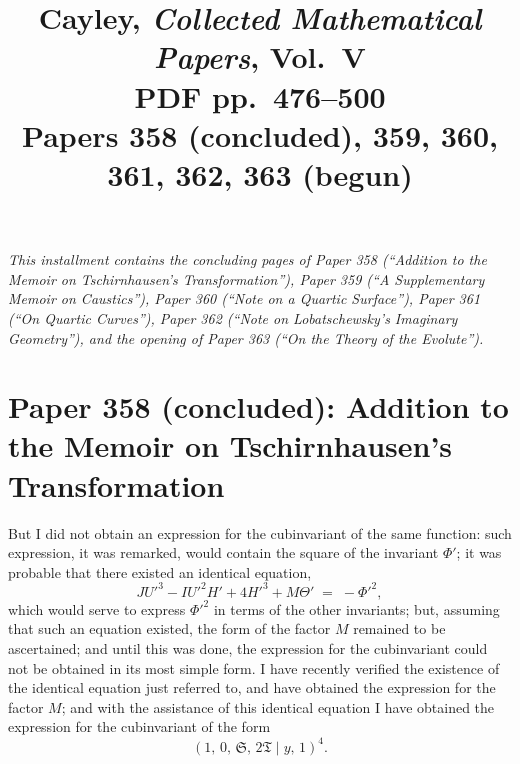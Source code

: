 \documentclass[11pt]{article}
\title{Cayley, \emph{Collected Mathematical Papers}, Vol.~V\\
PDF pp.\ 476--500\\
Papers 358 (concluded), 359, 360, 361, 362, 363 (begun)}
\author{}
\date{}
\begin{document}
\maketitle

\noindent\textit{This installment contains the concluding pages of Paper 358 (``Addition to the Memoir on Tschirnhausen's Transformation''), Paper 359 (``A Supplementary Memoir on Caustics''), Paper 360 (``Note on a Quartic Surface''), Paper 361 (``On Quartic Curves''), Paper 362 (``Note on Lobatschewsky's Imaginary Geometry''), and the opening of Paper 363 (``On the Theory of the Evolute'').}

\bigskip

\section*{Paper 358 (concluded): Addition to the Memoir on Tschirnhausen's Transformation}

\medskip{}

\medskip
But I did not obtain an expression for the cubinvariant of the same function: such expression, it was remarked, would contain the square of the invariant $\Phi'$; it was probable that there existed an identical equation,
\[
JU'^{3} - IU'^{2}H' + 4H'^{3} + M\Theta' \;=\; -\Phi'^{2},
\]
which would serve to express $\Phi'^{2}$ in terms of the other invariants; but, assuming that such an equation existed, the form of the factor $M$ remained to be ascertained; and until this was done, the expression for the cubinvariant could not be obtained in its most simple form. I have recently verified the existence of the identical equation just referred to, and have obtained the expression for the factor $M$; and with the assistance of this identical equation I have obtained the expression for the cubinvariant of the form
\[
(1,\,0,\,\mathfrak{S},\,2\mathfrak{T} \mid y,\,1)^{4}.
\]
\end{document}
